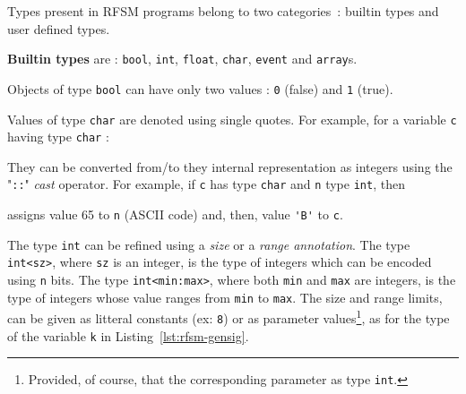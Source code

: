 Types present in RFSM programs belong to two categories~: builtin types and user defined types.

\medskip
\textbf{Builtin types} are : \texttt{bool}, \texttt{int}, \texttt{float}, \texttt{char}, \texttt{event} and
\texttt{array}s.

\medskip
\step Objects of type \texttt{bool} can have only two values : \texttt{0} (false) and \texttt{1} (true).

\step Values of type \texttt{char} are
denoted using single quotes. For example, for a variable \verb|c| having type \verb|char| :
\begin{center}
\end{center}
They can be converted from/to they internal representation as integers using the "\verb|::|" \emph{cast}
operator. For example, if \verb|c| has type \verb|char| and \verb|n| type \verb|int|, then 
\begin{center}
\end{center}
assigns value 65 to \verb|n| (ASCII code) and, then, value \verb|'B'| to \verb|c|.


\medskip
\step The type \texttt{int} can be refined using a \emph{size} or a \emph{range annotation}. The
type \verb|int<sz>|, where \verb|sz| is an integer, is the type of integers which can be encoded using
\verb|n| bits. The type \verb|int<min:max>|, where both \verb|min| and \verb|max| are integers, is
the type of integers whose value ranges from \verb|min| to \verb|max|. The size and range limits,
can be given as litteral constants (ex: \verb|8|) or as parameter values\footnote{Provided, of
  course, that the corresponding parameter as type \texttt{int}.}, as for the type of the
variable \texttt{k} in Listing~\ref{lst:rfsm-gensig}.

